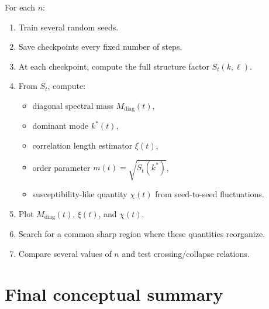 \documentclass[11pt]{article}
\newcommand{\diag}{\mathrm{diag}}
\begin{document}
For each $n$:
\begin{enumerate}
    \item Train several random seeds.
    \item Save checkpoints every fixed number of steps.
    \item At each checkpoint, compute the full structure factor $S_t(k,\ell)$.
    \item From $S_t$, compute:
    \begin{itemize}
        \item diagonal spectral mass $M_{\diag}(t)$,
        \item dominant mode $k^*(t)$,
        \item correlation length estimator $\xi(t)$,
        \item order parameter $m(t)=\sqrt{S_t(k^*)}$,
        \item susceptibility-like quantity $\chi(t)$ from seed-to-seed fluctuations.
    \end{itemize}
    \item Plot $M_{\diag}(t)$, $\xi(t)$, and $\chi(t)$.
    \item Search for a common sharp region where these quantities reorganize.
    \item Compare several values of $n$ and test crossing/collapse relations.
\end{enumerate}

\section{Final conceptual summary}
\end{document}
